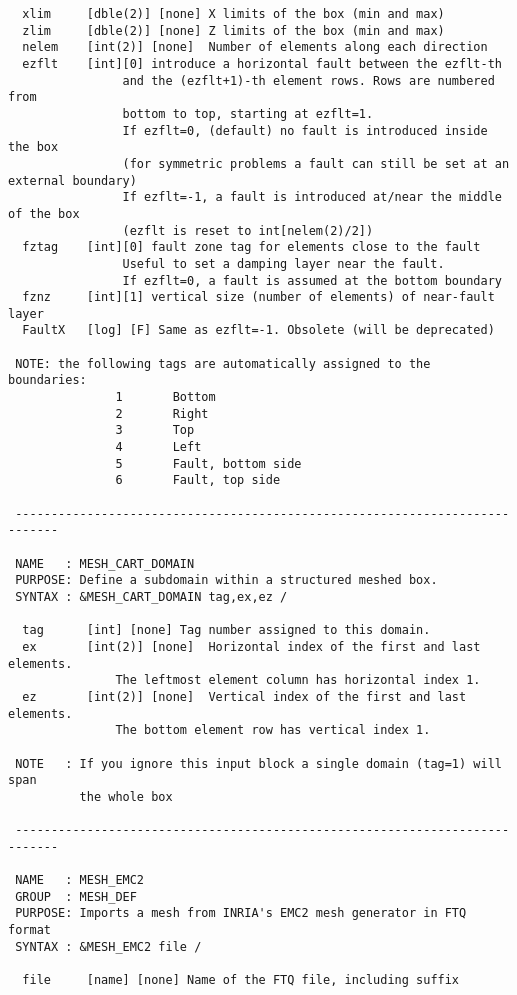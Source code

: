 \begin{verbatim}
  xlim     [dble(2)] [none] X limits of the box (min and max)
  zlim     [dble(2)] [none] Z limits of the box (min and max)
  nelem    [int(2)] [none]  Number of elements along each direction
  ezflt    [int][0] introduce a horizontal fault between the ezflt-th
                and the (ezflt+1)-th element rows. Rows are numbered from
                bottom to top, starting at ezflt=1.
                If ezflt=0, (default) no fault is introduced inside the box
                (for symmetric problems a fault can still be set at an external boundary)
                If ezflt=-1, a fault is introduced at/near the middle of the box
                (ezflt is reset to int[nelem(2)/2])
  fztag    [int][0] fault zone tag for elements close to the fault
                Useful to set a damping layer near the fault.
                If ezflt=0, a fault is assumed at the bottom boundary
  fznz     [int][1] vertical size (number of elements) of near-fault layer
  FaultX   [log] [F] Same as ezflt=-1. Obsolete (will be deprecated) 

 NOTE: the following tags are automatically assigned to the boundaries: 
               1       Bottom 
               2       Right        
               3       Top  
               4       Left
               5       Fault, bottom side
               6       Fault, top side

 ----------------------------------------------------------------------------

 NAME   : MESH_CART_DOMAIN
 PURPOSE: Define a subdomain within a structured meshed box.
 SYNTAX : &MESH_CART_DOMAIN tag,ex,ez /

  tag      [int] [none] Tag number assigned to this domain. 
  ex       [int(2)] [none]	Horizontal index of the first and last elements.
               The leftmost element column has horizontal index 1.
  ez       [int(2)] [none]	Vertical index of the first and last elements.
               The bottom element row has vertical index 1.

 NOTE   : If you ignore this input block a single domain (tag=1) will span 
          the whole box 

 ----------------------------------------------------------------------------

 NAME   : MESH_EMC2
 GROUP  : MESH_DEF
 PURPOSE: Imports a mesh from INRIA's EMC2 mesh generator in FTQ format
 SYNTAX : &MESH_EMC2 file /

  file     [name] [none] Name of the FTQ file, including suffix


\end{verbatim}
